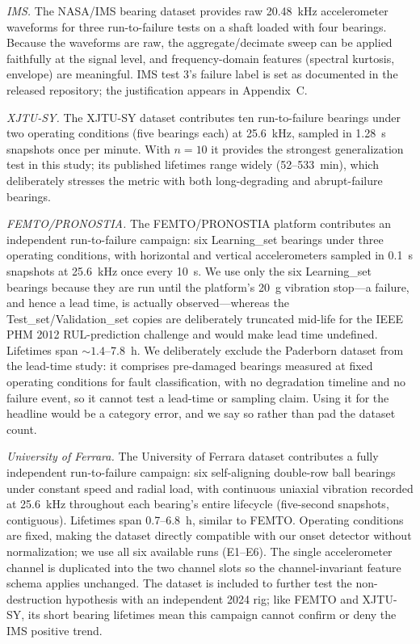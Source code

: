 \documentclass[IJPHM, 2026, 0]{PHMSociety}
\begin{document}
\emph{IMS.} The NASA/IMS bearing dataset \cite{qiu2006wavelet} provides raw 20.48~kHz accelerometer waveforms for three run-to-failure tests on a shaft loaded with four bearings. Because the waveforms are raw, the aggregate/decimate sweep can be applied faithfully at the signal level, and frequency-domain features (spectral kurtosis, envelope) are meaningful. IMS test 3's failure label is set as documented in the released repository; the justification appears in Appendix~C.

\emph{XJTU-SY.} The XJTU-SY dataset \cite{wang2020hybrid} contributes ten run-to-failure bearings under two operating conditions (five bearings each) at 25.6~kHz, sampled in 1.28~s snapshots once per minute. With $n=10$ it provides the strongest generalization test in this study; its published lifetimes range widely (52--533~min), which deliberately stresses the metric with both long-degrading and abrupt-failure bearings.

\emph{FEMTO/PRONOSTIA.} The FEMTO/PRONOSTIA platform \cite{nectoux2012pronostia} contributes an independent run-to-failure campaign: six Learning\_set bearings under three operating conditions, with horizontal and vertical accelerometers sampled in 0.1~s snapshots at 25.6~kHz once every 10~s. We use only the six Learning\_set bearings because they are run until the platform's 20~g vibration stop---a failure, and hence a lead time, is actually observed---whereas the Test\_set/Validation\_set copies are deliberately truncated mid-life for the IEEE PHM 2012 RUL-prediction challenge and would make lead time undefined. Lifetimes span ${\sim}1.4$--7.8~h. We deliberately exclude the Paderborn dataset \cite{lessmeier2016condition} from the lead-time study: it comprises pre-damaged bearings measured at fixed operating conditions for fault classification, with no degradation timeline and no failure event, so it cannot test a lead-time or sampling claim. Using it for the headline would be a category error, and we say so rather than pad the dataset count.

\emph{University of Ferrara.} The University of Ferrara dataset \cite{arpa2024ferrara} contributes a fully independent run-to-failure campaign: six self-aligning double-row ball bearings under constant speed and radial load, with continuous uniaxial vibration recorded at 25.6~kHz throughout each bearing's entire lifecycle (five-second snapshots, contiguous). Lifetimes span 0.7--6.8~h, similar to FEMTO. Operating conditions are fixed, making the dataset directly compatible with our onset detector without normalization; we use all six available runs (E1--E6). The single accelerometer channel is duplicated into the two channel slots so the channel-invariant feature schema applies unchanged. The dataset is included to further test the non-destruction hypothesis with an independent 2024 rig; like FEMTO and XJTU-SY, its short bearing lifetimes mean this campaign cannot confirm or deny the IMS positive trend.
\end{document}
